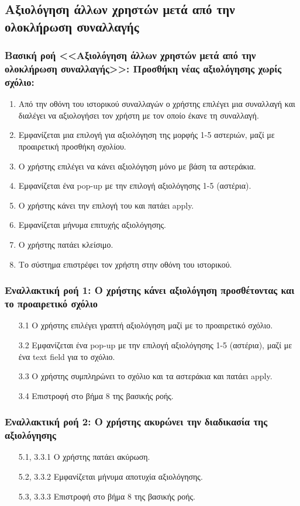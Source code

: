 \documentclass[12pt,a4paper]{article}
\begin{document}
\subsection{Αξιολόγηση άλλων χρηστών μετά από την ολοκλήρωση συναλλαγής}

\subsubsection*{Βασική ροή <<Αξιολόγηση άλλων χρηστών μετά από την ολοκλήρωση συναλλαγής>>: Προσθήκη νέας αξιολόγησης χωρίς σχόλιο:}
\begin{enumerate}
    \item Από την οθόνη του ιστορικού συναλλαγών ο χρήστης επιλέγει μια συναλλαγή και διαλέγει να αξιολογήσει τον χρήστη με τον οποίο έκανε τη συναλλαγή.
    \item Εμφανίζεται μια επιλογή για αξιολόγηση της μορφής 1-5 αστεριών, μαζί με προαιρετική προσθήκη σχολίου.
    \item Ο χρήστης επιλέγει να κάνει αξιολόγηση μόνο με βάση τα αστεράκια.
    \item Εμφανίζεται ένα pop-up με την επιλογή αξιολόγησης 1-5 (αστέρια).
    \item Ο χρήστης κάνει την επιλογή του και πατάει apply.
    \item Εμφανίζεται μήνυμα επιτυχής αξιολόγησης.
    \item Ο χρήστης πατάει κλείσιμο.
    \item Το σύστημα επιστρέφει τον χρήστη στην οθόνη του ιστορικού.
\end{enumerate}

\subsubsection*{Εναλλακτική ροή 1: Ο χρήστης κάνει αξιολόγηση προσθέτοντας και το προαιρετικό σχόλιο}
\begin{enumerate}
    \item [3.1] Ο χρήστης επιλέγει γραπτή αξιολόγηση μαζί με το προαιρετικό σχόλιο.
    \item [3.2] Εμφανίζεται ένα pop-up με την επιλογή αξιολόγησης 1-5 (αστέρια), μαζί με ένα text field για το σχόλιο.
    \item [3.3] Ο χρήστης συμπληρώνει το σχόλιο και τα αστεράκια και πατάει apply.
    \item [3.4] Επιστροφή στο βήμα 8 της βασικής ροής.
\end{enumerate}

\subsubsection*{Εναλλακτική ροή 2: Ο χρήστης ακυρώνει την διαδικασία της αξιολόγησης}
\begin{enumerate}
    \item [5.1, 3.3.1] Ο χρήστης πατάει ακύρωση.
    \item [5.2, 3.3.2] Εμφανίζεται μήνυμα αποτυχία αξιολόγησης.
    \item [5.3, 3.3.3] Επιστροφή στο βήμα 8 της βασικής ροής.
\end{enumerate}
\end{document}
